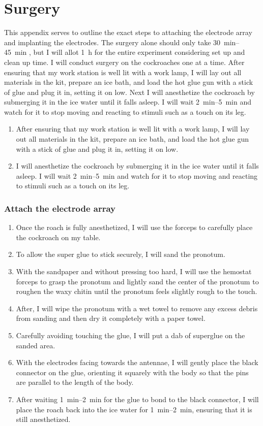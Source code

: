 \section{Surgery}
This appendix serves to outline the exact steps to attaching the electrode array and implanting the electrodes. The surgery alone should only take \SIrange{30}{45}{\minute} , but I will allot \SI{1}{\hour} for the entire experiment considering set up and clean up time. I will conduct surgery on the cockroaches one at a time. After ensuring that my work station is well lit with a work lamp, I will lay out all materials in the kit, prepare an ice bath, and load the hot glue gun with a stick of glue and plug it in, setting it on low. Next I will anesthetize the cockroach by submerging it in the ice water until it falls asleep. I will wait \SIrange{2}{5}{\minute} and watch for it to stop moving and reacting to stimuli such as a touch on its leg.

\begin{enumerate}
\item After ensuring that my work station is well lit with a work lamp, I will lay out all materials in the kit, prepare an ice bath, and load the hot glue gun with a stick of glue and plug it in, setting it on low.
\item I will anesthetize the cockroach by submerging it in the ice water until it falls asleep.
    \subitem I will wait \SIrange{2}{5}{\minute} and watch for it to stop moving and reacting to stimuli such as a touch on its leg.
\end{enumerate}

\subsubsection{Attach the electrode array}
\begin{enumerate}
    \item Once the roach is fully anesthetized, I will use the forceps to carefully place the cockroach on my table. 
    \item To allow the super glue to stick securely, I will sand the pronotum.
    \item With the sandpaper and without pressing too hard, I will use the hemostat forceps to grasp the pronotum and lightly sand the center of the pronotum to roughen the waxy chitin until the pronotum feels slightly rough to the touch.
    \item After, I will wipe the pronotum with a wet towel to remove any excess debris from sanding and then dry it completely with a paper towel.
    \item Carefully avoiding touching the glue, I will put a dab of superglue on the sanded area.
    \item With the electrodes facing towards the antennae, I will gently place the black connector on the glue, orienting it squarely with the body so that the pins are parallel to the length of the body.
    \item After waiting \SIrange{1}{2}{\minute} for the glue to bond to the black connector, I will place the roach back into the ice water for \SIrange{1}{2}{\minute}, ensuring that it is still anesthetized.
\end{enumerate}

